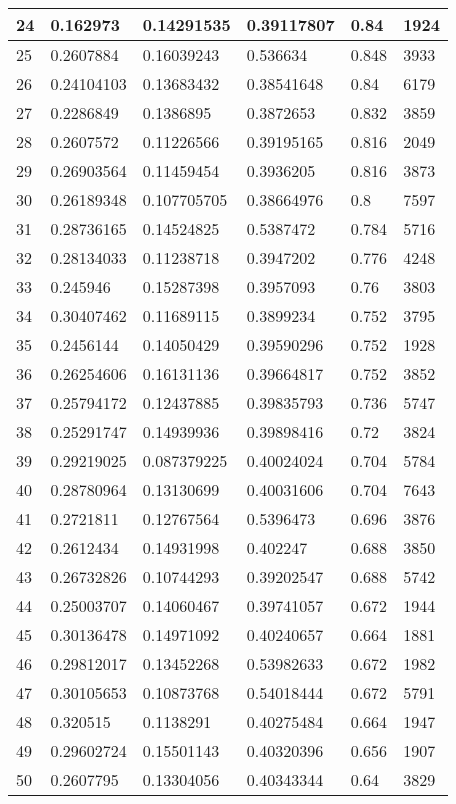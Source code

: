 \begin{longtable}{|l|l|l|l|l|l|}
24 & 0.162973 & 0.14291535 & 0.39117807 & 0.84 & 1924 \\ \hline 
25 & 0.2607884 & 0.16039243 & 0.536634 & 0.848 & 3933 \\ \hline 
26 & 0.24104103 & 0.13683432 & 0.38541648 & 0.84 & 6179 \\ \hline 
27 & 0.2286849 & 0.1386895 & 0.3872653 & 0.832 & 3859 \\ \hline 
28 & 0.2607572 & 0.11226566 & 0.39195165 & 0.816 & 2049 \\ \hline 
29 & 0.26903564 & 0.11459454 & 0.3936205 & 0.816 & 3873 \\ \hline 
30 & 0.26189348 & 0.107705705 & 0.38664976 & 0.8 & 7597 \\ \hline 
31 & 0.28736165 & 0.14524825 & 0.5387472 & 0.784 & 5716 \\ \hline 
32 & 0.28134033 & 0.11238718 & 0.3947202 & 0.776 & 4248 \\ \hline 
33 & 0.245946 & 0.15287398 & 0.3957093 & 0.76 & 3803 \\ \hline 
34 & 0.30407462 & 0.11689115 & 0.3899234 & 0.752 & 3795 \\ \hline 
35 & 0.2456144 & 0.14050429 & 0.39590296 & 0.752 & 1928 \\ \hline 
36 & 0.26254606 & 0.16131136 & 0.39664817 & 0.752 & 3852 \\ \hline 
37 & 0.25794172 & 0.12437885 & 0.39835793 & 0.736 & 5747 \\ \hline 
38 & 0.25291747 & 0.14939936 & 0.39898416 & 0.72 & 3824 \\ \hline 
39 & 0.29219025 & 0.087379225 & 0.40024024 & 0.704 & 5784 \\ \hline 
40 & 0.28780964 & 0.13130699 & 0.40031606 & 0.704 & 7643 \\ \hline 
41 & 0.2721811 & 0.12767564 & 0.5396473 & 0.696 & 3876 \\ \hline 
42 & 0.2612434 & 0.14931998 & 0.402247 & 0.688 & 3850 \\ \hline 
43 & 0.26732826 & 0.10744293 & 0.39202547 & 0.688 & 5742 \\ \hline 
44 & 0.25003707 & 0.14060467 & 0.39741057 & 0.672 & 1944 \\ \hline 
45 & 0.30136478 & 0.14971092 & 0.40240657 & 0.664 & 1881 \\ \hline 
46 & 0.29812017 & 0.13452268 & 0.53982633 & 0.672 & 1982 \\ \hline 
47 & 0.30105653 & 0.10873768 & 0.54018444 & 0.672 & 5791 \\ \hline 
48 & 0.320515 & 0.1138291 & 0.40275484 & 0.664 & 1947 \\ \hline 
49 & 0.29602724 & 0.15501143 & 0.40320396 & 0.656 & 1907 \\ \hline 
50 & 0.2607795 & 0.13304056 & 0.40343344 & 0.64 & 3829 \\ \hline 
\end{longtable}